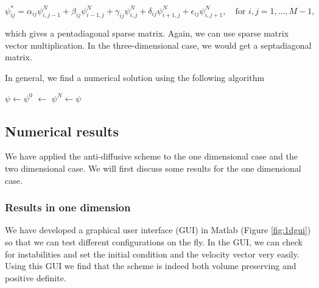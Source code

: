 \documentclass[10pt, a4paper]{article}
\begin{document}
\begin{equation*}
\psi_{ij}^* = \alpha_{ij} \psi_{i,j-1}^N + \beta_{ij} \psi_{i-1,j}^N +\gamma_{ij} \psi_{i,j}^N +\delta_{ij} \psi_{i+1,j}^N + \epsilon_{ij} \psi_{i,j+1}^N, \quad \text{for } i,j=1,\ldots,M-1,
\end{equation*}

which gives a pentadiagonal sparse matrix. Again, we can use sparse matrix vector multiplication. In the three-dimensional case, we would get a septadiagonal matrix.

In general, we find a numerical solution using the following algorithm

\IncMargin{1em}
\begin{algorithm}[H]
\BlankLine
$\psi \leftarrow \psi^0$\;
\Mone $\leftarrow$ \;
$\psi^N \leftarrow \psi$\;
\end{algorithm}
\DecMargin{1em}





\subsection{Numerical results}
We have applied the anti-diffusive scheme to the one dimensional case and the two dimensional case. We will first discuss some results for the one dimensional case.


\subsubsection{Results in one dimension}
We have developed a graphical user interface (GUI) in Matlab (Figure \ref{fig:1dgui}) so that we can test different configurations on the fly. In the GUI, we can check for instabilities and set the initial condition and the velocity vector very easily. Using this GUI we find that the scheme is indeed both volume preserving and positive definite.
\end{document}
